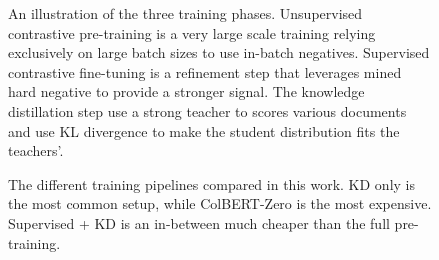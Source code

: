 \begin{figure}
  \centering
  \resizebox{\textwidth}{!}{}
  \caption{An illustration of the three training phases. Unsupervised contrastive pre-training is a very large scale training relying exclusively on large batch sizes to use in-batch negatives. Supervised contrastive fine-tuning is a refinement step that leverages mined hard negative to provide a stronger signal. The knowledge distillation step use a strong teacher to scores various documents and use KL divergence to make the student distribution fits the teachers'. }
  \label{2602:fig:training_phase}
\end{figure}

\begin{figure}
  \centering
  \resizebox{\textwidth}{!}{}
  \caption{The different training pipelines compared in this work. KD only is the most common setup, while ColBERT-Zero is the most expensive. Supervised + KD is an in-between much cheaper than the full pre-training.}
  \label{2602:fig:pipelines}
\end{figure}



